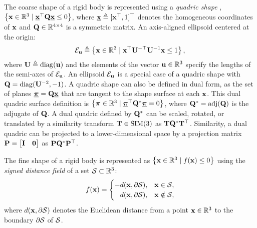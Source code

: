 The coarse shape of a rigid body is represented using a \emph{quadric shape} \cite[Ch.3]{MVGBook}, $\left\{ \mathbf{x} \in \mathbb{R}^3 \mid \underline{\mathbf{x}}^\top \mathbf{Q} \underline{\mathbf{x}} \leq 0\right\}$, where $\underline{\mathbf{x}} \triangleq [\mathbf{x}^\top, 1]^\top$ denotes the homogeneous coordinates of $\mathbf{x}$ and $\mathbf{Q} \in \mathbb{R}^{4 \times 4}$ is a symmetric matrix. An axis-aligned ellipsoid centered at the origin:
%
\begin{equation}
\label{eq:ellipsoid}
\mathcal{E}_{\mathbf{u}} \triangleq \left\{\mathbf{x} \in \mathbb{R}^3 \mid \mathbf{x}^\top \mathbf{U}^{-\top}\mathbf{U}^{-1}\mathbf{x} \leq 1\right\},
\end{equation}
%
where $\mathbf{U} \triangleq \operatorname{diag}(\mathbf{u})$ and the elements of the vector $\mathbf{u} \in \mathbb{R}^3$ specify the lengths of the semi-axes of $\mathcal{E}_{\mathbf{u}}$. An ellipsoid $\mathcal{E}_{\mathbf{u}}$ is a special case of a quadric shape with $\mathbf{Q} = \operatorname{diag}(\mathbf{U}^{-2},-1)$. 
A quadric shape can also be defined in dual form, as the set of planes $\underline{\boldsymbol{\pi}} = \mathbf{Q}\underline{\mathbf{x}}$ that are tangent to the shape surface at each $\mathbf{x}$. This dual quadric surface definition is $\left\{ \boldsymbol{\pi} \in \mathbb{R}^3 \mid \underline{\boldsymbol{\pi}}^\top \mathbf{Q}^* \underline{\boldsymbol{\pi}} = 0\right\}$, where $\mathbf{Q}^* = \operatorname{adj}(\mathbf{Q})$ is the adjugate of $\mathbf{Q}$.
A dual quadric defined by $\mathbf{Q}^*$ can be scaled, rotated, or translated by a similarity transform $\mathbf{T} \in \text{SIM}(3)$ as $\mathbf{T} \mathbf{Q}^* \mathbf{T}^\top$. Similarity, a dual quadric can be projected to a lower-dimensional space by a projection matrix $\mathbf{P} = \begin{bmatrix} \mathbf{I} & \mathbf{0} \end{bmatrix}$ as $\mathbf{P} \mathbf{Q}^* \mathbf{P}^\top$.

The fine shape of a rigid body is represented as $\left\{\mathbf{x} \in \mathbb{R}^3 \mid f(\mathbf{x}) \leq 0\right\}$ using the \emph{signed distance field} of a set ${\cal S} \subset \mathbb{R}^3$:
%
\begin{equation}
f(\mathbf{x}) = \begin{cases}
  -d(\mathbf{x},\partial{\cal S}), & \mathbf{x} \in {\cal S},\\
  \phantom{-}d(\mathbf{x},\partial{\cal S}), & \mathbf{x} \notin {\cal S},
\end{cases}
\end{equation}
%
where $d(\mathbf{x},\partial{\cal S})$ denotes the Euclidean distance from a point $\mathbf{x} \in \mathbb{R}^3$ to the boundary $\partial{\cal S}$ of ${\cal S}$.























